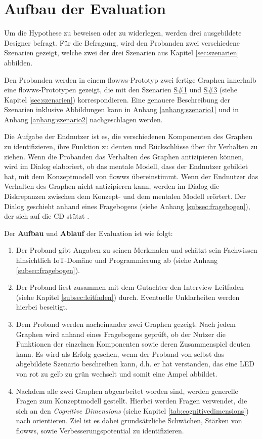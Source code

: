 \section{Aufbau der Evaluation}
Um die Hypothese zu beweisen oder zu widerlegen, werden drei ausgebildete Designer befragt. Für die Befragung, wird den Probanden zwei verschiedene Szenarien gezeigt, welche zwei der drei Szenarien aus Kapitel \ref{sec:szenarien} abbilden.

Den Probanden werden in einem flowws-Prototyp zwei fertige Graphen innerhalb eine flowws-Prototypen gezeigt, die mit den Szenarien \hyperref[szenario1]{S\#1} und  \hyperref[szenario3]{S\#3} (siehe Kapitel \ref{sec:szenarien}) korrespondieren. Eine genauere Beschreibung der Szenarien inklusive Abbildungen kann in Anhang \ref{anhang:szenario1} und in Anhang \ref{anhang:szenario2} nachgeschlagen werden.

Die Aufgabe der Endnutzer ist es, die verschiedenen Komponenten des Graphen zu identifizieren, ihre Funktion zu deuten und Rückschlüsse über ihr Verhalten zu ziehen. Wenn die Probanden das Verhalten des Graphen antizipieren können, wird im Dialog elaboriert, ob das mentale Modell, dass der Endnutzer gebildet hat, mit dem Konzeptmodell von flowws übereinstimmt. Wenn der Endnutzer das Verhalten des Graphen nicht antizipieren kann, werden im Dialog die Diskrepanzen zwischen dem Konzept- und dem mentalen Modell erörtert. Der Dialog geschieht anhand eines Fragebogens (siehe Anhang \ref{subsec:fragebogen}), der sich auf die \ac{CD} stützt \cite{blackwell2000cognitive}.

Der \textbf{Aufbau} und \textbf{Ablauf} der Evaluation ist wie folgt:
\begin{enumerate}
    \item Der Proband gibt Angaben zu seinen Merkmalen und schätzt sein Fachwissen hinsichtlich \ac{IoT}-Domäne und Programmierung ab (siehe Anhang \ref{subsec:fragebogen}).
    \item Der Proband liest zusammen mit dem Gutachter den Interview Leitfaden (siehe Kapitel \ref{subsec:leitfaden}) durch. Eventuelle Unklarheiten werden hierbei beseitigt. 
    \item Dem Proband werden nacheinander zwei Graphen gezeigt. Nach jedem Graphen wird anhand eines Fragebogens geprüft, ob der Nutzer die Funktionen der einzelnen Komponenten sowie deren Zusammenspiel deuten kann. Es wird als Erfolg gesehen, wenn der Proband von selbst das abgebildete Szenario beschreiben kann, d.h. er hat verstanden, das eine LED von rot zu gelb zu grün wechselt und somit eine Ampel abbildet. 
    \item Nachdem alle zwei Graphen abgearbeitet worden sind, werden generelle Fragen zum Konzeptmodell gestellt. Hierbei werden Fragen verwendet, die sich an den \textit{Cognitive Dimensions} (siehe Kapitel \ref{tab:cognitivedimensions}) nach \cite{blackwell2000cognitive} orientieren. Ziel ist es dabei grundsätzliche Schwächen, Stärken von flowws, sowie Verbesserungspotential zu identifizieren.
\end{enumerate}

